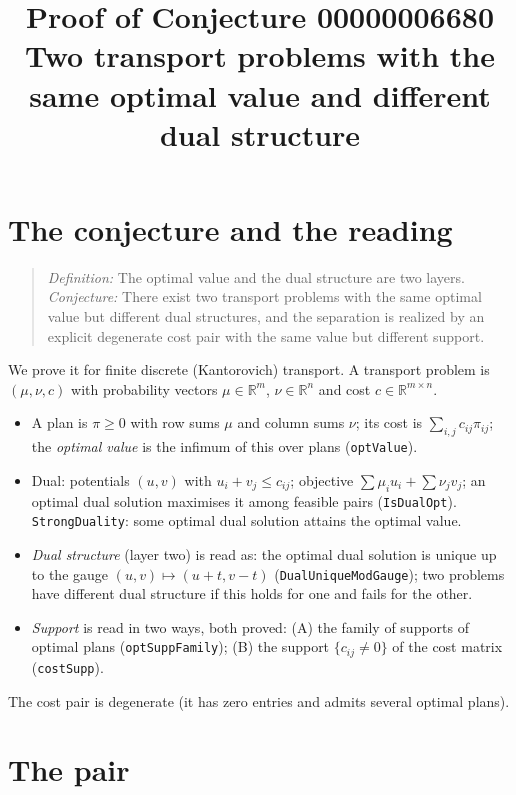 \documentclass[11pt]{article}
\title{Proof of Conjecture 00000006680\\[2pt]
\large Two transport problems with the same optimal value and different dual structure}
\date{}
\renewcommand{\_}{\oldus\allowbreak}
\theoremstyle{definition}
\theoremstyle{remark}
\begin{document}
\sloppy
\maketitle

\section{The conjecture and the reading}

\begin{quote}
\emph{Definition:} The optimal value and the dual structure are two layers.
\emph{Conjecture:} There exist two transport problems with the same optimal value but different dual
structures, and the separation is realized by an explicit degenerate cost pair with the same value but different
support.
\end{quote}

We prove it for finite discrete (Kantorovich) transport. A transport problem is $(\mu,\nu,c)$ with probability
vectors $\mu\in\mathbb R^m$, $\nu\in\mathbb R^n$ and cost $c\in\mathbb R^{m\times n}$.
\begin{itemize}
\item A plan is $\pi\ge 0$ with row sums $\mu$ and column sums $\nu$; its cost is $\sum_{i,j}c_{ij}\pi_{ij}$;
 the \emph{optimal value} is the infimum of this over plans (\texttt{optValue}).
\item Dual: potentials $(u,v)$ with $u_i+v_j\le c_{ij}$; objective $\sum\mu_iu_i+\sum\nu_jv_j$; an optimal dual
 solution maximises it among feasible pairs (\texttt{IsDualOpt}). \texttt{StrongDuality}: some optimal dual
 solution attains the optimal value.
\item \emph{Dual structure} (layer two) is read as: the optimal dual solution is unique up to the gauge
 $(u,v)\mapsto(u+t,v-t)$ (\texttt{DualUniqueModGauge}); two problems have different dual structure if this holds
 for one and fails for the other.
\item \emph{Support} is read in two ways, both proved: (A) the family of supports of optimal plans
 (\texttt{optSuppFamily}); (B) the support $\{c_{ij}\neq0\}$ of the cost matrix (\texttt{costSupp}).
\end{itemize}
The cost pair is degenerate (it has zero entries and admits several optimal plans).

\section{The pair}
\end{document}
